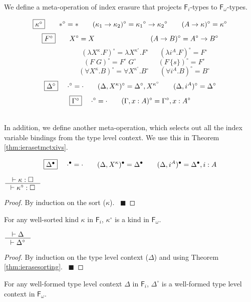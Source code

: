 \documentclass{llncs}
\renewcommand{\qed}{~\hfill$\blacksquare$}
\newcommand{\Fi}{\ensuremath{\mathsf{F}_i}}
\newcommand{\Fw}{\ensuremath{\mathsf{F}_\omega}}
\begin{document}
We define a meta-operation of index erasure that projects $\Fi$-types
to $\Fw$-types.
\begin{definition}\label{def:ierase}
\[ \fbox{$\kappa^\circ$}
 ~~~~ ~~
 *^\circ =
 *
 ~~~~ ~~
 (\kappa_1 -> \kappa_2)^\circ =
 {\kappa_1}^\circ -> {\kappa_2}^\circ
 ~~~~ ~~
 (A -> \kappa)^\circ =
 \kappa^\circ
\]
\[ \fbox{$F^\circ$}
 ~~~~ ~~
 X^\circ =
 X
 ~~~~ ~~~~ ~~~~ ~~~~ ~~~~ ~~~~
 (A -> B)^\circ =
 A^\circ -> B^\circ
\]
\[ \qquad \qquad
 (\lambda X^\kappa.F)^\circ =
 \lambda X^{\kappa^\circ}.F^\circ
 ~~~~ ~~~
 (\lambda i^A.F)^\circ =
 F^\circ
\]
\[ \qquad \qquad
 (F\;G)^\circ =
 F^\circ\;G^\circ
 ~~~~ ~~~~ ~~~~ ~~
 (F\,\{s\})^\circ =
 F^\circ
\]
\[ \qquad \qquad
 (\forall X^\kappa . B)^\circ =
 \forall X^{\kappa^\circ} . B^\circ
 ~~~~ ~~~
 (\forall i^A . B)^\circ =
 B^\circ
\]
\[ \fbox{$\Delta^\circ$}
 ~~~~
 \cdot^\circ = \cdot
 ~~~~ ~~
 (\Delta,X^\kappa)^\circ = \Delta^\circ,X^{\kappa^\circ}
 ~~~~ ~~
 (\Delta,i^A)^\circ = \Delta^\circ
\]
\[ \fbox{$\Gamma^\circ$}
 ~~~~
 \cdot^\circ = \cdot
 ~~~~ ~~
 (\Gamma,x:A)^\circ = \Gamma^\circ,x:A^\circ
\]
\end{definition}~\\
In addition, we define another meta-operation, which selects out
all the index variable bindings from the type level context.
We use this in Theorem \ref{thm:ierasetmctxivs}.
\begin{definition}
        \[ \fbox{$\Delta^\bullet$} ~~~~ \cdot^\bullet = \cdot \qquad
        (\Delta,X^\kappa)^\bullet = \Delta^\bullet \qquad
        (\Delta,i^A)^\bullet = \Delta^\bullet,i:A
\]
\end{definition}



\begin{theorem}
\label{thm:ierasesorting}
        $\inference{|- \kappa : \square}{|- \kappa^\circ : \square}$
\end{theorem}
\begin{proof}
        By induction on the sort ($\kappa$).
	\qed
\end{proof}
\begin{remark}
For any well-sorted kind $\kappa$ in \Fi,
$\kappa^\circ$ is a kind in \Fw.
\end{remark}

\begin{theorem}
\label{thm:ierasetyctx}
$ \inference{|- \Delta}{|- \Delta^\circ} $
\end{theorem}
\begin{proof}
        By induction on the type level context ($\Delta$)
        and using Theorem \ref{thm:ierasesorting}.
	\qed
\end{proof}
\begin{remark}
For any well-formed type level context $\Delta$ in \Fi,
$\Delta^\circ$ is a well-formed type level context in \Fw.
\end{remark}
\end{document}
